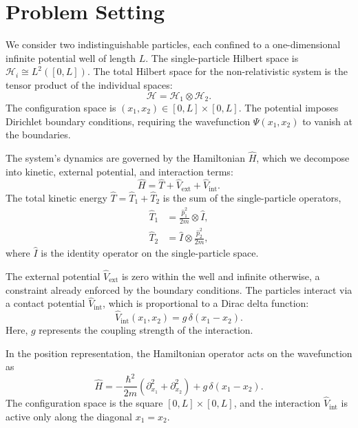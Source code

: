 \section{Problem Setting} \label{sec:problem}

We consider two indistinguishable particles, each confined to a
one-dimensional infinite potential well of length $L$.
The single-particle Hilbert space is $\mathcal{H}_i \cong L^2([0, L])$.
The total Hilbert space for the non-relativistic system is the tensor
product of the individual spaces:
\begin{equation}
	\mathcal{H} = \mathcal{H}_1 \otimes \mathcal{H}_2.
\end{equation}
The configuration space is $(x_1, x_2) \in [0, L] \times [0, L]$.
The potential imposes Dirichlet boundary conditions,
requiring the wavefunction $\Psi(x_1, x_2)$ to vanish at the boundaries.

The system's dynamics are governed by the Hamiltonian $\hat{H}$,
which we decompose into kinetic, external potential, and interaction terms:
\begin{equation}
	\hat{H} = \hat{T} + \hat{V}_{\text{ext}} + \hat{V}_{\text{int}}.
\end{equation}
The total kinetic energy $\hat{T} = \hat{T}_1 + \hat{T}_2$ is the sum
of the single-particle operators,
\begin{align}
	\hat{T}_1 &= \frac{\hat{p}_1^2}{2m} \otimes \hat{I}, \\
	\hat{T}_2 &= \hat{I} \otimes \frac{\hat{p}_2^2}{2m},
\end{align}
where $\hat{I}$ is the identity operator on the single-particle space.

The external potential $\hat{V}_{\text{ext}}$ is zero within the well and
infinite otherwise, a constraint already enforced by the boundary
conditions. The particles interact via a contact potential
$\hat{V}_{\text{int}}$, which is proportional to a Dirac delta function:
\begin{equation}
	\hat{V}_{\text{int}}(x_1, x_2) = g\,\delta(x_1 - x_2).
\end{equation}
Here, $g$ represents the coupling strength of the interaction.

In the position representation, the Hamiltonian operator acts on
the wavefunction as
\begin{equation} \label{eq:hamiltonian}
	\hat{H} = -\frac{\hbar^2}{2m}\left(\partial_{x_1}^2 +
	\partial_{x_2}^2\right) + g\,\delta(x_1 - x_2).
\end{equation}
The configuration space is the square $[0, L] \times [0, L]$,
and the interaction $\hat{V}_{\text{int}}$ is active only along
the diagonal $x_1 = x_2$.

